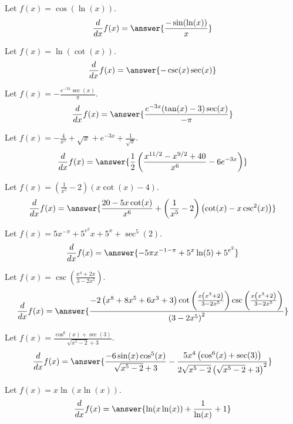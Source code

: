 \documentclass{ximera}
\begin{document}
\begin{shuffle}
\begin{exercise}
Let $f(x)=\cos (\ln (x))$.
\[
\ddx f(x) = \answer{\frac{-\sin (\ln (x))}{x}}
\]
\end{exercise}

\begin{exercise}
Let $f(x)=\ln (\cot (x))$.
\[
\ddx f(x) = \answer{-\csc (x) \sec (x)}
\]
\end{exercise}

\begin{exercise}
Let $f(x)=-\frac{e^{-3 x} \sec (x)}{\pi }$.
\[
\ddx f(x) = \answer{\frac{e^{-3 x} (\tan (x)-3) \sec (x)}{-\pi }}
\]
\end{exercise}

\begin{exercise}
Let $f(x)=-\frac{4}{x^5}+\sqrt{x}+e^{-3 x}+\frac{1}{\sqrt{x}}$.
\[
\ddx f(x) = \answer{\frac{1}{2} \left(\frac{x^{11/2}-x^{9/2}+40}{x^6}-6 e^{-3 x}\right)}
\]
\end{exercise}

\begin{exercise}
Let $f(x)=\left(\frac{1}{x^5}-2\right) (x \cot (x)-4)$.
\[
\ddx f(x) = \answer{\frac{20-5 x \cot (x)}{x^6}+\left(\frac{1}{x^5}-2\right) \left(\cot (x)-x \csc ^2(x)\right)}
\]
\end{exercise}

\begin{exercise}
Let $f(x)=5 x^{-\pi }+5^{e^2} x+5^x+\sec ^5(2)$.
\[
\ddx f(x) = \answer{-5 \pi  x^{-1-\pi }+5^x \ln (5)+5^{e^2}}
\]
\end{exercise}

\begin{exercise}
Let $f(x)=\csc \left(\frac{x^4+2 x}{3-2 x^5}\right)$.
\[
\ddx f(x) = \answer{\frac{-2 \left(x^8+8 x^5+6 x^3+3\right) \cot \left(\frac{x \left(x^3+2\right)}{3-2 x^5}\right) \csc \left(\frac{x \left(x^3+2\right)}{3-2 x^5}\right)}{\left(3-2 x^5\right)^2}}
\]
\end{exercise}

\begin{exercise}
Let $f(x)=\frac{\cos ^6(x)+\sec (3)}{\sqrt{x^5-2}+3}$.
\[
\ddx f(x) = \answer{\frac{-6 \sin (x) \cos ^5(x)}{\sqrt{x^5-2}+3}-\frac{5 x^4 \left(\cos ^6(x)+\sec (3)\right)}{2 \sqrt{x^5-2} \left(\sqrt{x^5-2}+3\right)^2}}
\]
\end{exercise}

\begin{exercise}
Let $f(x)=x \ln (x \ln (x))$.
\[
\ddx f(x) = \answer{\ln (x \ln (x))+\frac{1}{\ln (x)}+1}
\]
\end{exercise}


\end{shuffle}
\end{document}
